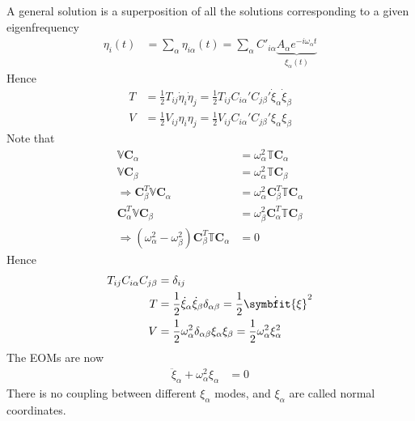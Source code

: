 \documentclass[twoside,9pt]{article}
\numberwithin{equation}{section} %
\theoremstyle{definition}
\theoremstyle{remark}
\begin{document}
A general solution is a superposition of all the solutions corresponding to
a given eigenfrequency
\begin{align}
    \eta_i(t) &= \sum_\alpha\eta_{i\alpha}(t)
    = \sum_\alpha  C'_{i\alpha}
    \underbrace{A_\alpha e^{-i\omega_\alpha t}}_{\xi_\alpha(t)}
\end{align}
Hence
\begin{align}
    T &= \frac{1}{2}T_{ij}\dot\eta_i\dot\eta_j 
    = \frac{1}{2}T_{ij}C_{i\alpha}'C_{j\beta}'\dot\xi_\alpha\dot\xi_\beta\\
    V &= \frac{1}{2}V_{ij}\eta_i\eta_j = \frac{1}{2}V_{ij}C_{i\alpha}'C_{j\beta}'
    \xi_\alpha\xi_\beta
\end{align}
Note that 
\begin{align}
    \mathbb V\mathbf{C}_\alpha &= \omega_\alpha^2\mathbb T\mathbf{C}_\alpha\\
    \mathbb V\mathbf{C}_\beta &= \omega_\alpha^2\mathbb T\mathbf{C}_\beta\\
    \Rightarrow
    \mathbf C_\beta^T\mathbb V\mathbf C_\alpha &= 
    \omega_\alpha^2\mathbf C_\beta^T \mathbb{T}\mathbf C_\alpha\\
    \mathbf C_\alpha^T\mathbb V\mathbf C_\beta &= 
    \omega_\beta^2\mathbf C_\alpha^T \mathbb{T}\mathbf C_\beta\\
    \Rightarrow
    (\omega_\alpha^2 - \omega_\beta^2)\mathbf C_\beta^T\mathbb T\mathbf C_\alpha &= 0
\end{align}
Hence
\begin{align}
    T_{ij}C_{i\alpha}C_{j\beta} &= \delta_{ij}\\
    T &= \frac{1}{2}\dot\xi_\alpha\dot\xi_\beta\delta_{\alpha\beta}
    = \frac{1}{2}\dot{\symbfit{\xi}}^2\\
    V &= \frac{1}{2}\omega_\alpha^2\delta_{\alpha\beta}\xi_\alpha\xi_\beta
    = \frac{1}{2}\omega_\alpha^2\xi_\alpha^2
\end{align}
The EOMs are now
\begin{align}
    \ddot\xi_\alpha + \omega^2_\alpha\xi_\alpha &= 0
\end{align}
There is no coupling between different $\xi_\alpha$ modes,
and $\xi_\alpha$ are called normal coordinates.
\end{document}
